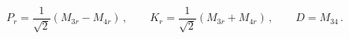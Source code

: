 \begin{equation}\label{llm22.10b}
P_r = \frac{1}{\sqrt{2}} (M_{3r} - M_{4r} ) \, , \qquad K_r =
\frac{1}{\sqrt{2}} (M_{3r} + M_{4r} ) \, , \qquad D= M_{34} \, .
\end{equation}

